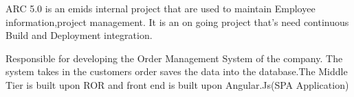 \documentclass[]{deedy-resume-openfont}
\begin{document}
\begin{minipage}[t]{0.66\textwidth}
\vspace{\topsep}
\vspace{\topsep}
\vspace{\topsep}
\sectionsep

\vspace{\topsep}
ARC 5.0 is an emids internal project that are used to maintain Employee information,project management.
It is an on going project that's need continuous Build and Deployment integration.
\sectionsep


\sectionsep
{}
\vspace{\topsep}
Responsible for developing the Order Management System of the company. The system takes in the customers order saves the data into the database.The Middle Tier is built upon ROR and front end is built upon Angular.Js(SPA Application)
\sectionsep


\sectionsep


\end{minipage} 
\end{document}
